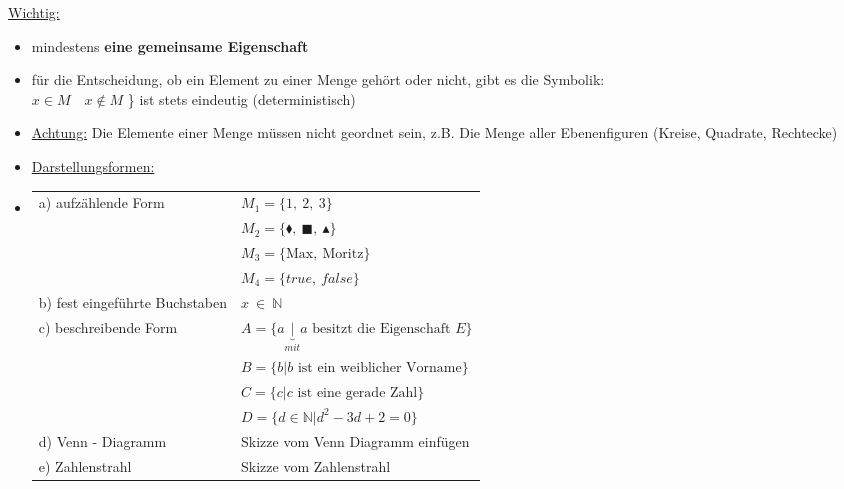                 \underline{Wichtig:}
                    \begin{itemize}[leftmargin=*]
                        \item mindestens \bfseries eine \mdseries gemeinsame Eigenschaft
                        \item für die Entscheidung, ob ein Element zu einer Menge gehört oder nicht, gibt es die Symbolik: \\
                            $x \in M \quad x \notin M $ \} ist stets eindeutig (deterministisch)
                        \item \underline{Achtung:} Die Elemente einer Menge müssen nicht geordnet sein, z.B. Die Menge aller Ebenenfiguren (Kreise, Quadrate, Rechtecke)
                        \item \underline{Darstellungsformen:}
                        \item[] \begin{tabular}{@{}l p{9cm}}
                            a) aufzählende Form             & $M_1 = \{1, \ 2, \ 3\} $  \\
                                                            & $M_2 = \{\blacklozenge, \ \blacksquare, \ \blacktriangle \} $  \\
                                                            & $M_3 = \{\text{Max}, \ \text{Moritz}\} $ \\
                                                            & $M_4 = \{true, \ false\} $ \\
                            b) fest eingeführte Buchstaben  &  $ x \ \in \ \mathbb{N}$\\ 
                            c) beschreibende Form           & $A = \{a \underbrace{|}_{mit} a \text{~besitzt die Eigenschaft~} E\}$\\
                                                            & $B = \{b | b \text{~ist ein weiblicher Vorname} \} $ \\
                                                            & $C = \{c | c \text{~ist eine gerade Zahl} \} $ \\
                                                            & $D = \{d \in \mathbb{N} | d^2 - 3d + 2 = 0 \} $\\
                            d) Venn - Diagramm              & Skizze vom Venn Diagramm einfügen \\
                            e) Zahlenstrahl                 & Skizze vom Zahlenstrahl \\

\end{tabular}
\end{itemize}
